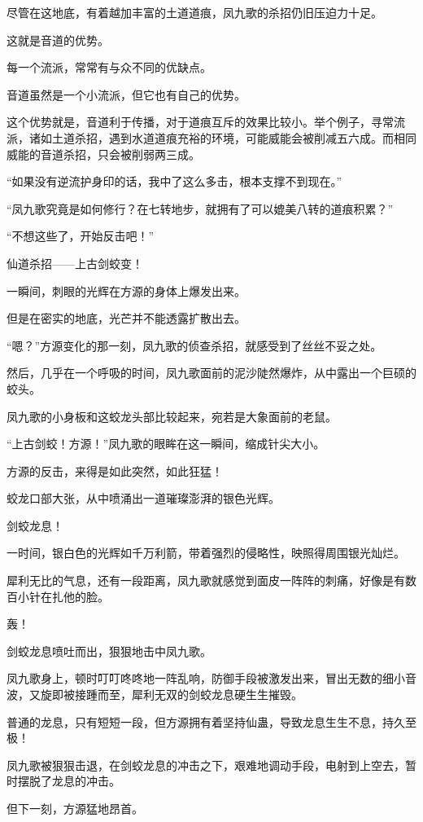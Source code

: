 \begin{this_body}
尽管在这地底，有着越加丰富的土道道痕，凤九歌的杀招仍旧压迫力十足。

这就是音道的优势。

每一个流派，常常有与众不同的优缺点。

音道虽然是一个小流派，但它也有自己的优势。

这个优势就是，音道利于传播，对于道痕互斥的效果比较小。举个例子，寻常流派，诸如土道杀招，遇到水道道痕充裕的环境，可能威能会被削减五六成。而相同威能的音道杀招，只会被削弱两三成。

“如果没有逆流护身印的话，我中了这么多击，根本支撑不到现在。”

“凤九歌究竟是如何修行？在七转地步，就拥有了可以媲美八转的道痕积累？”

“不想这些了，开始反击吧！”

仙道杀招——上古剑蛟变！

一瞬间，刺眼的光辉在方源的身体上爆发出来。

但是在密实的地底，光芒并不能透露扩散出去。

“嗯？”方源变化的那一刻，凤九歌的侦查杀招，就感受到了丝丝不妥之处。

然后，几乎在一个呼吸的时间，凤九歌面前的泥沙陡然爆炸，从中露出一个巨硕的蛟头。

凤九歌的小身板和这蛟龙头部比较起来，宛若是大象面前的老鼠。

“上古剑蛟！方源！”凤九歌的眼眸在这一瞬间，缩成针尖大小。

方源的反击，来得是如此突然，如此狂猛！

蛟龙口部大张，从中喷涌出一道璀璨澎湃的银色光辉。

剑蛟龙息！

一时间，银白色的光辉如千万利箭，带着强烈的侵略性，映照得周围银光灿烂。

犀利无比的气息，还有一段距离，凤九歌就感觉到面皮一阵阵的刺痛，好像是有数百小针在扎他的脸。

轰！

剑蛟龙息喷吐而出，狠狠地击中凤九歌。

凤九歌身上，顿时叮叮咚咚地一阵乱响，防御手段被激发出来，冒出无数的细小音波，又旋即被接踵而至，犀利无双的剑蛟龙息硬生生摧毁。

普通的龙息，只有短短一段，但方源拥有着坚持仙蛊，导致龙息生生不息，持久至极！

凤九歌被狠狠击退，在剑蛟龙息的冲击之下，艰难地调动手段，电射到上空去，暂时摆脱了龙息的冲击。

但下一刻，方源猛地昂首。


\end{this_body}
